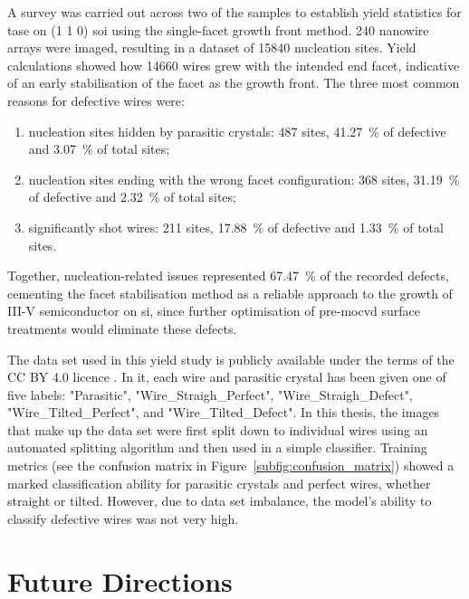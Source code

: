 A survey was carried out across two of the samples to establish yield statistics for \acs{tase} on \hkl(1 1 0) \acs{soi} using the single-facet  growth front method. \num{240} nanowire arrays were imaged, resulting in a dataset of \num{15840} nucleation sites. Yield calculations showed how \num{14660} wires grew with the intended end facet, indicative of an early stabilisation of the  facet as the growth front. The three most common reasons for defective wires were:

\begin{enumerate}
    \item nucleation sites hidden by parasitic crystals: \num{487} sites, \qty{41.27}{\percent} of defective and \qty{3.07}{\percent} of total sites;
    \item nucleation sites ending with the wrong facet configuration: \num{368} sites, \qty{31.19}{\percent} of defective and \qty{2.32}{\percent} of total sites;
    \item significantly shot wires: \num{211} sites, \qty{17.88}{\percent} of defective and \qty{1.33}{\percent} of total sites.
\end{enumerate}

Together, nucleation-related issues represented \qty{67.47}{\percent} of the recorded defects, cementing the facet stabilisation method as a reliable approach to the growth of III-V semiconductor on \acl{si}, since further optimisation of pre-\acs{mocvd} surface treatments would eliminate these defects.

The data set used in this yield study is publicly available \cite{dataset} under the terms of the CC BY 4.0 licence \cite{CCBY40}. In it, each wire and parasitic crystal has been given one of five labels: "Parasitic", "Wire\_Straigh\_Perfect", "Wire\_Straigh\_Defect", "Wire\_Tilted\_Perfect", and "Wire\_Tilted\_Defect". In this thesis, the images that make up the data set were first split down to individual wires using an automated splitting algorithm \cite{code} and then used in a simple classifier. Training metrics (see the confusion matrix in Figure~\ref{subfig:confusion_matrix}) showed a marked classification ability for parasitic crystals and perfect wires, whether straight or tilted. However, due to data set imbalance, the model's ability to classify defective wires was not very high.

\section{Future Directions}

